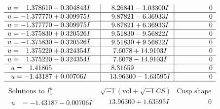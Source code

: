 \documentclass[1p]{elsarticle_modified}
\theoremstyle{definition}
\newcommand{\I}{\sqrt{-1}}
\begin{document}
$$\begin{array}{c|c|c}
\begin{aligned}
u &= \phantom{-}1.378610 - 0.304843 I\end{aligned}
 & \phantom{-}8.26841 - 1.03300 I & \phantom{-0.000000 } 0 \\ \hline\begin{aligned}
u &= -1.377770 + 0.309975 I\end{aligned}
 & \phantom{-}9.87821 - 6.36933 I & \phantom{-0.000000 } 0 \\ \hline\begin{aligned}
u &= -1.377770 - 0.309975 I\end{aligned}
 & \phantom{-}9.87821 + 6.36933 I & \phantom{-0.000000 } 0 \\ \hline\begin{aligned}
u &= -1.375830 + 0.320526 I\end{aligned}
 & \phantom{-}9.51830 - 9.56822 I & \phantom{-0.000000 } 0 \\ \hline\begin{aligned}
u &= -1.375830 - 0.320526 I\end{aligned}
 & \phantom{-}9.51830 + 9.56822 I & \phantom{-0.000000 } 0 \\ \hline\begin{aligned}
u &= \phantom{-}1.375220 + 0.324354 I\end{aligned}
 & \phantom{-}7.6078 + 14.9103 I & \phantom{-0.000000 } 0 \\ \hline\begin{aligned}
u &= \phantom{-}1.375220 - 0.324354 I\end{aligned}
 & \phantom{-}7.6078 - 14.9103 I & \phantom{-0.000000 } 0 \\ \hline\begin{aligned}
u &= \phantom{-}1.41865\phantom{ +0.000000I}\end{aligned}
 & \phantom{-}8.31659\phantom{ +0.000000I} & \phantom{-0.000000 } 0 \\ \hline\begin{aligned}
u &= -1.43187 + 0.00706 I\end{aligned}
 & \phantom{-}13.96300 - 1.63595 I & \phantom{-0.000000 } 0\\
 \hline 
 \end{array}$$\newpage$$\begin{array}{c|c|c}  
\text{Solutions to }I^u_{1}& \I (\text{vol} + \sqrt{-1}CS) & \text{Cusp shape}\\
 \hline 
\begin{aligned}
u &= -1.43187 - 0.00706 I\end{aligned}
 & \phantom{-}13.96300 + 1.63595 I & \phantom{-0.000000 } 0 \\ \hline\begin{aligned}

\end{aligned}
\end{array}$$
\end{document}
